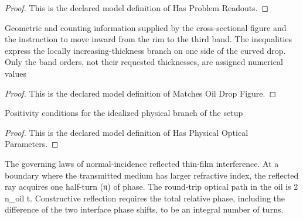 \begin{proof}
  This is the declared model definition of Has Problem Readouts.
\end{proof}
\begin{definition}
  \label{def:physics:phyx-mini-0084:phyxminiproblems-problemphyxmini0084-matchesoildropfigure}
  Geometric and counting information supplied by the cross-sectional figure and the instruction to move inward from the rim to the third band. The inequalities express the locally increasing-thickness branch on one side of the curved drop. Only the band orders, not their requested thicknesses, are assigned numerical values
\end{definition}
\begin{proof}
  This is the declared model definition of Matches Oil Drop Figure.
\end{proof}
\begin{definition}
  \label{def:physics:phyx-mini-0084:phyxminiproblems-problemphyxmini0084-hasphysicalopticalparameters}
  Positivity conditions for the idealized physical branch of the setup
\end{definition}
\begin{proof}
  This is the declared model definition of Has Physical Optical Parameters.
\end{proof}
\begin{definition}
  \label{def:physics:phyx-mini-0084:phyxminiproblems-problemphyxmini0084-satisfiesreflectedthinfilminterference}
  The governing laws of normal-incidence reflected thin-film interference. At a boundary where the transmitted medium has larger refractive index, the reflected ray acquires one half-turn (π) of phase. The round-trip optical path in the oil is 2 n\_oil t. Constructive reflection requires the total relative phase, including the difference of the two interface phase shifts, to be an integral number of turns.
\end{definition}
